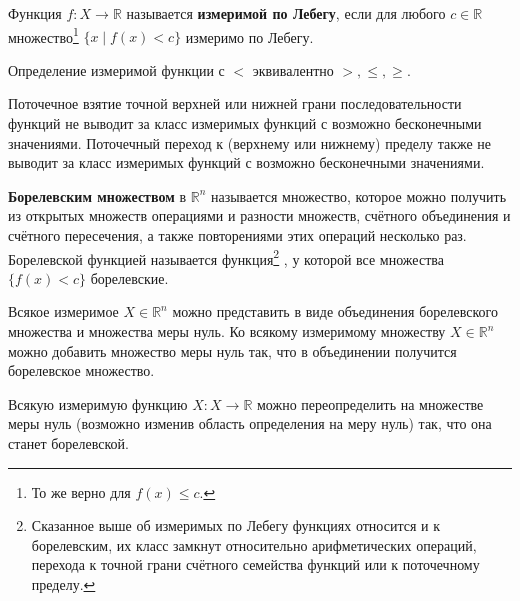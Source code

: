 
\begin{to_def}
    Функция $f \colon X \to \mathbb{R}$ называется \textbf{измеримой по Лебегу}, если для любого $c \in \mathbb{R}$ множество\footnote{
        То же верно для $f(x) \leq c$.
    } $\{ x \mid f(x) < c \}$ измеримо по Лебегу.
\end{to_def}

\begin{to_lem}
\label{lem5.39}
    Определение измеримой функции с $<$ эквивалентно $> , \leq, \geq$.
\end{to_lem}

\begin{to_thr}
\label{thr5.41}
    Поточечное взятие точной верхней или нижней грани последовательности функций не выводит за класс измеримых функций с возможно бесконечными значениями. Поточечный переход к (верхнему или нижнему) пределу также не выводит за класс измеримых функций с возможно бесконечными значениями.
\end{to_thr} 

\begin{to_def}
    \textbf{Борелевским множеством} в $\mathbb{R}^n$ называется множество, которое можно получить из открытых множеств операциями и разности множеств, счётного объединения и счётного пересечения, а также повторениями этих операций несколько раз.
Борелевской функцией называется функция\footnote{
    Сказанное выше об измеримых по Лебегу функциях относится и к борелевским, их
класс замкнут относительно арифметических операций, перехода к точной грани счётного семейства функций или к поточечному пределу.
}
, у которой все множества $\{ f(x) < c \}$ борелевские.
\end{to_def}


\begin{to_thr}
\label{thr5.45}
    Всякое измеримое $X \in \mathbb{R}^n$ можно представить в виде объединения борелевского множества и множества меры нуль. Ко всякому измеримому множеству $X \in \mathbb{R}^n$ можно добавить множество меры нуль так, что в объединении получится борелевское множество.
\end{to_thr}

\begin{to_thr}
\label{thr5.46}
    Всякую измеримую функцию $X \colon X \to \mathbb{R}$ можно переопределить на множестве меры нуль (возможно изменив область определения на меру нуль) так, что она станет борелевской.
\end{to_thr}

